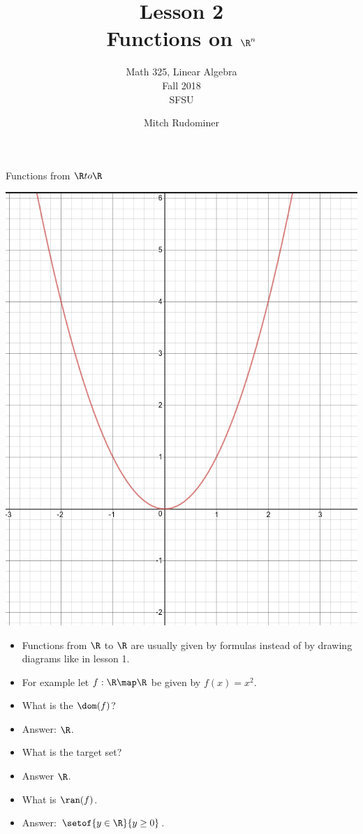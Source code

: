 \documentclass{beamer}
\title{Lesson 2 \\ Functions on $\R^n$}
\subtitle{Math 325, Linear Algebra \\ Fall 2018 \\ SFSU}
\author{Mitch Rudominer}
\date{}
\begin{document}
\begin{frame}
  \titlepage
\end{frame}

\begin{frame}{Functions from $\R to \R$}

\includegraphics[scale=0.1]{parabola}

\begin{itemize}
\item Functions from $\R$ to $\R$ are usually given by formulas instead of
by drawing diagrams like in lesson 1.
\item For example let $f:\R\map\R$ be given by $f(x) = x^2$.
\item What is the $\dom(f)$?
\item Answer: $\R$.
\item What is the target set?
\item Answer $\R$.
\item What is $\ran(f)$.
\item Answer: $\setof{y\in\R}{y\geq 0}$.
\end{itemize}

\end{frame}
\end{document}
